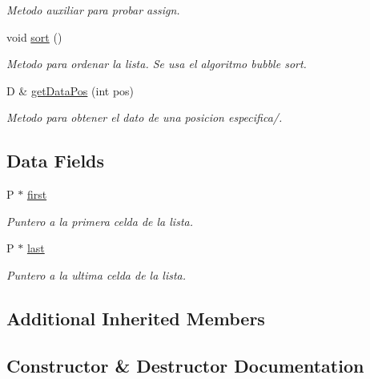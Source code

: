 \begin{DoxyCompactItemize}
\begin{DoxyCompactList}\small\item\em Metodo auxiliar para probar assign. \end{DoxyCompactList}\item 
void \hyperlink{classListWithPointer_aa46631b2da29895d1f767626fb591bc8}{sort} ()
\begin{DoxyCompactList}\small\item\em Metodo para ordenar la lista. Se usa el algoritmo bubble sort. \end{DoxyCompactList}\item 
D \& \hyperlink{classListWithPointer_a17e4d8c8161af659bcb860f045fbf44b}{get\+Data\+Pos} (int pos)
\begin{DoxyCompactList}\small\item\em Metodo para obtener el dato de una posicion especifica/. \end{DoxyCompactList}\end{DoxyCompactItemize}
\subsection*{Data Fields}
\begin{DoxyCompactItemize}
\item 
P $\ast$ \hyperlink{classListWithPointer_a4d39ded7ea1ef992576f70a933414e12}{first}
\begin{DoxyCompactList}\small\item\em Puntero a la primera celda de la lista. \end{DoxyCompactList}\item 
P $\ast$ \hyperlink{classListWithPointer_a639d3b9eba9d217b59b19aaa59b291a7}{last}
\begin{DoxyCompactList}\small\item\em Puntero a la ultima celda de la lista. \end{DoxyCompactList}\end{DoxyCompactItemize}
\subsection*{Additional Inherited Members}


\subsection{Constructor \& Destructor Documentation}
